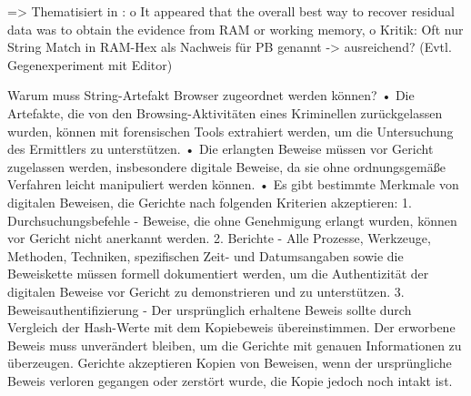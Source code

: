=> Thematisiert in \cite{Ohana.2013}:
	o	It appeared that the overall best way to recover residual data was to obtain the evidence from RAM or working memory,
	o	Kritik: Oft nur String Match in RAM-Hex als Nachweis für PB genannt -> ausreichend? (Evtl. Gegenexperiment mit Editor)


Warum muss String-Artefakt Browser zugeordnet werden können? \cite{Izzati.2022}
	•	Die Artefakte, die von den Browsing-Aktivitäten eines Kriminellen zurückgelassen wurden, können mit forensischen Tools extrahiert werden, um die Untersuchung des Ermittlers zu unterstützen.
	•	Die erlangten Beweise müssen vor Gericht zugelassen werden, insbesondere digitale Beweise, da sie ohne ordnungsgemäße Verfahren leicht manipuliert werden können.
	•	Es gibt bestimmte Merkmale von digitalen Beweisen, die Gerichte nach folgenden Kriterien akzeptieren:
	1.	Durchsuchungsbefehle - Beweise, die ohne Genehmigung erlangt wurden, können vor Gericht nicht anerkannt werden.
	2.	Berichte - Alle Prozesse, Werkzeuge, Methoden, Techniken, spezifischen Zeit- und Datumsangaben sowie die Beweiskette müssen formell dokumentiert werden, um die Authentizität der digitalen Beweise vor Gericht zu demonstrieren und zu unterstützen.
	3.	Beweisauthentifizierung - Der ursprünglich erhaltene Beweis sollte durch Vergleich der Hash-Werte mit dem Kopiebeweis übereinstimmen. Der erworbene Beweis muss unverändert bleiben, um die Gerichte mit genauen Informationen zu überzeugen. Gerichte akzeptieren Kopien von Beweisen, wenn der ursprüngliche Beweis verloren gegangen oder zerstört wurde, die Kopie jedoch noch intakt ist.
	


